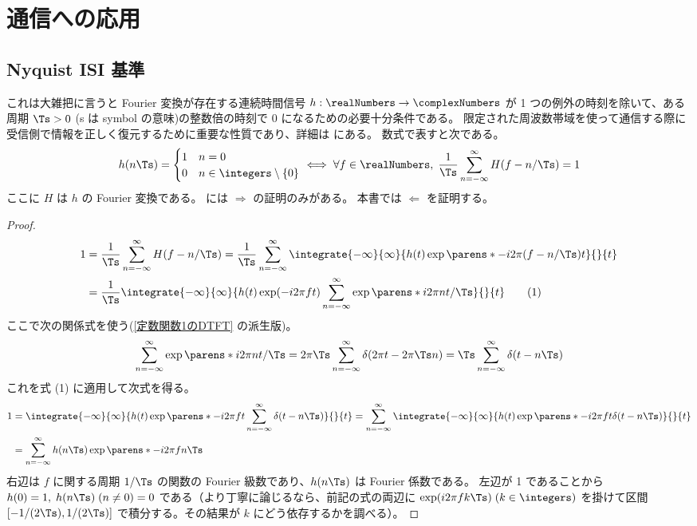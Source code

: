 \chapter{通信への応用}
    \section{Nyquist ISI 基準}
        これは大雑把に言うと Fourier 変換が存在する連続時間信号 $h:\realNumbers\to\complexNumbers$ が 1 つの例外の時刻を除いて、ある周期 $\Ts>0$ (s は symbol の意味)の整数倍の時刻で 0 になるための必要十分条件である。
        限定された周波数帯域を使って通信する際に受信側で情報を正しく復元するために重要な性質であり、詳細は \cite{Nyquist_ISI_crit} にある。
        数式で表すと次である。
        \[
            h(n\Ts) = \begin{cases}
                1 & n=0 \\
                0 & n\in\integers\setminus\{0\}
            \end{cases}
            \iff \forall f\in\realNumbers,\;\frac{1}{\Ts}\sum_{n=-\infty}^\infty H(f-n/\Ts) = 1
        \]
        ここに $H$ は $h$ の Fourier 変換である。
        \cite{Nyquist_ISI_crit} には $\Rightarrow$ の証明のみがある。
        本書では $\Leftarrow$ を証明する。
        \begin{proof}
            \begin{align*}
                1 &= \frac{1}{\Ts}\sum_{n=-\infty}^\infty H(f-n/\Ts) = \frac{1}{\Ts}\sum_{n=-\infty}^\infty\integrate{-\infty}{\infty}{h(t)\exp\parens*{-i2\pi(f-n/\Ts)t}}{}{t} \\
                &= \frac{1}{\Ts}\integrate{-\infty}{\infty}{h(t)\exp(-i2\pi ft)\sum_{n=-\infty}^\infty\exp\parens*{i2\pi nt/\Ts}}{}{t} \tag{1}
            \end{align*}
            ここで次の関係式を使う(\ref{定数関数1のDTFT} の派生版)。
            \[ \sum_{n=-\infty}^\infty\exp\parens*{i2\pi nt/\Ts} = 2\pi\Ts\sum_{n=-\infty}^\infty\delta(2\pi t-2\pi\Ts n) = \Ts\sum_{n=-\infty}^\infty\delta(t-n\Ts) \]
            これを式 (1) に適用して次式を得る。
            \begin{align*}
                1 &= \integrate{-\infty}{\infty}{h(t)\exp\parens*{-i2\pi ft}\sum_{n=-\infty}^\infty\delta(t-n\Ts)}{}{t} = \sum_{n=-\infty}^\infty\integrate{-\infty}{\infty}{h(t)\exp\parens*{-i2\pi ft}\delta(t-n\Ts)}{}{t} \\
                &= \sum_{n=-\infty}^\infty h(n\Ts)\exp\parens*{-i2\pi fn\Ts}
            \end{align*}
            右辺は $f$ に関する周期 $1/\Ts$ の関数の Fourier 級数であり、$h(n\Ts)$ は Fourier 係数である。
            左辺が 1 であることから $h(0) = 1,\;h(n\Ts)\;(n\neq 0) = 0$ である（より丁寧に論じるなら、前記の式の両辺に $\exp(i2\pi fk\Ts)\;(k\in\integers)$ を掛けて区間 $[-1/(2\Ts),1/(2\Ts)]$ で積分する。その結果が $k$ にどう依存するかを調べる）。
        \end{proof}
